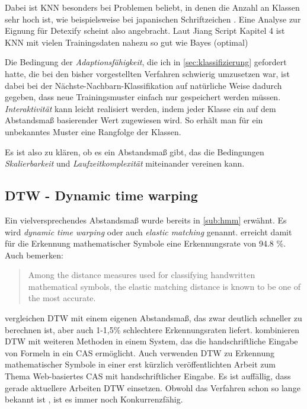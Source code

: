 Dabei ist KNN besonders bei Problemen beliebt, in denen die Anzahl an Klassen sehr hoch ist, wie beispielsweise bei japanischen Schriftzeichen \cite{Jaeger:2003p1097}. Eine Analyse zur Eignung für Detexify scheint also angebracht.
\TODO Laut Jiang Script Kapitel 4 ist KNN mit vielen Trainingsdaten nahezu so gut wie Bayes (optimal)

Die Bedingung der \emph{Adaptionsfähigkeit}, die ich in \ref{sec:klassifizierung} gefordert hatte, die bei den bisher vorgestellten Verfahren schwierig umzusetzen war, ist dabei bei der Nächste-Nachbarn-Klassifikation auf natürliche Weise dadurch gegeben, dass neue Trainingsmuster einfach nur gespeichert werden müssen. \emph{Interaktivität} kann leicht realisiert werden, indem jeder Klasse ein auf dem Abstandsmaß basierender Wert zugewiesen wird. So erhält man für ein unbekanntes Muster eine Rangfolge der Klassen.

Es ist also zu klären, ob es ein Abstandsmaß gibt, das die Bedingungen \emph{Skalierbarkeit} und \emph{Laufzeitkomplexität} miteinander vereinen kann.

\subsection[DTW]{DTW - Dynamic time warping} \label{sub:dtw}

Ein vielversprechendes Abstandsmaß wurde bereits in \ref{sub:hmm} erwähnt. Es wird \emph{dynamic time warping} oder auch \emph{elastic matching} genannt. \citet{Xie:2007p11427} erreicht damit für die Erkennung mathematischer Symbole  eine Erkennungsrate von 94.8 \%. Auch \citet{Golubitsky:2009p2433} bemerken:
\begin{quote}
  Among the distance measures used for classifying handwritten mathematical symbols, the elastic matching distance is known to be one of the most accurate.
\end{quote}

\citet{Golubitsky:2009p1842} vergleichen DTW mit einem eigenen Abstandsmaß, das zwar deutlich schneller zu berechnen ist, aber auch 1-1,5\% schlechtere Erkennungsraten liefert. \citet{Labahn:2008p10301} kombinieren DTW mit weiteren Methoden in einem System, das die handschriftliche Eingabe von Formeln in ein \ac{CAS} ermöglicht.
Auch \citet{Vuong:2010p10279} verwenden DTW %
zu Erkennung mathematischer Symbole in einer erst kürzlich veröffentlichten Arbeit zum Thema Web-basiertes CAS mit handschriftlicher Eingabe. Es ist auffällig, dass gerade aktuellere Arbeiten DTW einsetzen. Obwohl das Verfahren schon so lange bekannt ist \cite{Tappert:1982p10305}, ist es immer noch Konkurrenzfähig.

